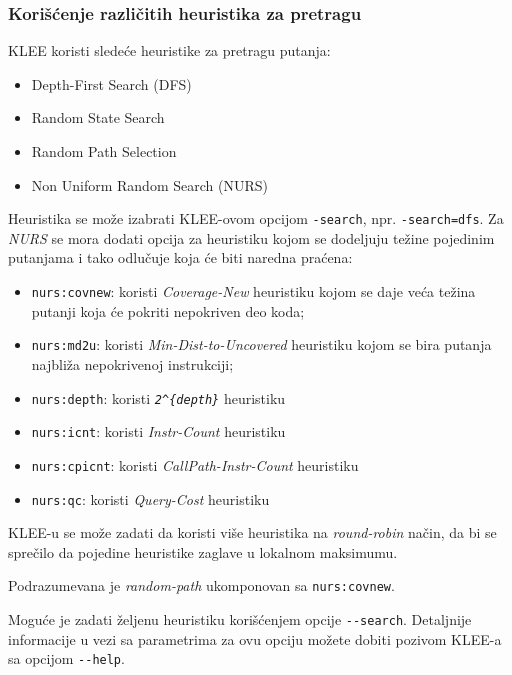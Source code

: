 \subsubsection{Korišćenje različitih heuristika za pretragu}\label{koriux161ux107enje-razliux10ditih-heuristika-za-pretragu}

KLEE koristi sledeće heuristike za pretragu putanja:

\begin{itemize}
\tightlist
\item
  Depth-First Search (DFS)
\item
  Random State Search
\item
  Random Path Selection
\item
  Non Uniform Random Search (NURS)
\end{itemize}

Heuristika se može izabrati KLEE-ovom opcijom \texttt{-search}, npr. \texttt{-search=dfs}. Za \emph{NURS} se mora dodati opcija za heuristiku kojom se dodeljuju težine pojedinim putanjama i tako odlučuje koja će biti naredna praćena:

\begin{itemize}
\tightlist
\item
  \texttt{nurs:covnew}: koristi \emph{Coverage-New} heuristiku kojom se daje veća težina putanji koja će pokriti nepokriven deo koda;
\item
  \texttt{nurs:md2u}: koristi \emph{Min-Dist-to-Uncovered} heuristiku kojom se bira putanja najbliža nepokrivenoj instrukciji;
\item
  \texttt{nurs:depth}: koristi \emph{\texttt{2\^{}\{depth\}}} heuristiku
\item
  \texttt{nurs:icnt}: koristi \emph{Instr-Count} heuristiku
\item
  \texttt{nurs:cpicnt}: koristi \emph{CallPath-Instr-Count} heuristiku
\item
  \texttt{nurs:qc}: koristi \emph{Query-Cost} heuristiku
\end{itemize}

KLEE-u se može zadati da koristi više heuristika na \emph{round-robin} način, da bi se sprečilo da pojedine heuristike zaglave u lokalnom maksimumu.

Podrazumevana je \emph{random-path} ukomponovan sa \texttt{nurs:covnew}.

Moguće je zadati željenu heuristiku korišćenjem opcije \texttt{-{}-search}. Detaljnije informacije u vezi sa parametrima za ovu opciju možete dobiti pozivom KLEE-a sa opcijom \texttt{-{}-help}.

